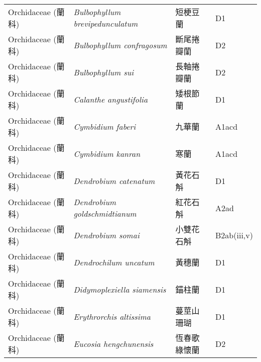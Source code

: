 \begin{longtable}{p{3cm}p{5cm}p{3cm}p{4cm}}
    Orchidaceae (蘭科) & \textit{Bulbophyllum brevipedunculatum}  & 短梗豆蘭 & D1 \index{Bulbophyllum@\textit{Bulbophyllum}!brevipedunculatum@\textit{brevipedunculatum}}  \index{短梗豆蘭} \\
    Orchidaceae (蘭科) & \textit{Bulbophyllum confragosum}  & 斷尾捲瓣蘭 & D2 \index{Bulbophyllum@\textit{Bulbophyllum}!confragosum@\textit{confragosum}}  \index{斷尾捲瓣蘭} \\
    Orchidaceae (蘭科) & \textit{Bulbophyllum sui}  & 長軸捲瓣蘭 & D2 \index{Bulbophyllum@\textit{Bulbophyllum}!sui@\textit{sui}}  \index{長軸捲瓣蘭} \\
    Orchidaceae (蘭科) & \textit{Calanthe angustifolia}  & 矮根節蘭 & D1 \index{Calanthe@\textit{Calanthe}!angustifolia@\textit{angustifolia}}  \index{矮根節蘭} \\
    Orchidaceae (蘭科) & \textit{Cymbidium faberi}  & 九華蘭 & A1acd \index{Cymbidium@\textit{Cymbidium}!faberi@\textit{faberi}}  \index{九華蘭} \\
    Orchidaceae (蘭科) & \textit{Cymbidium kanran}  & 寒蘭 & A1acd \index{Cymbidium@\textit{Cymbidium}!kanran@\textit{kanran}}  \index{寒蘭} \\
    Orchidaceae (蘭科) & \textit{Dendrobium catenatum}  & 黃花石斛 & D1 \index{Dendrobium@\textit{Dendrobium}!catenatum@\textit{catenatum}}  \index{黃花石斛} \\
    Orchidaceae (蘭科) & \textit{Dendrobium goldschmidtianum}  & 紅花石斛 & A2ad \index{Dendrobium@\textit{Dendrobium}!goldschmidtianum@\textit{goldschmidtianum}}  \index{紅花石斛} \\
    Orchidaceae (蘭科) & \textit{Dendrobium somai}  & 小雙花石斛 & B2ab(iii,v) \index{Dendrobium@\textit{Dendrobium}!somai@\textit{somai}}  \index{小雙花石斛} \\
    Orchidaceae (蘭科) & \textit{Dendrochilum uncatum}  & 黃穗蘭 & D1 \index{Dendrochilum@\textit{Dendrochilum}!uncatum@\textit{uncatum}}  \index{黃穗蘭} \\
    Orchidaceae (蘭科) & \textit{Didymoplexiella siamensis}  & 錨柱蘭 & D1 \index{Didymoplexiella@\textit{Didymoplexiella}!siamensis@\textit{siamensis}}  \index{錨柱蘭} \\
    Orchidaceae (蘭科) & \textit{Erythrorchis altissima}  & 蔓莖山珊瑚 & D1 \index{Erythrorchis@\textit{Erythrorchis}!altissima@\textit{altissima}}  \index{蔓莖山珊瑚} \\
    Orchidaceae (蘭科) & \textit{Eucosia hengchunensis}  & 恆春歌綠懷蘭 & D2 \index{Eucosia@\textit{Eucosia}!hengchunensis@\textit{hengchunensis}}  \index{恆春歌綠懷蘭} \\

\end{longtable}
